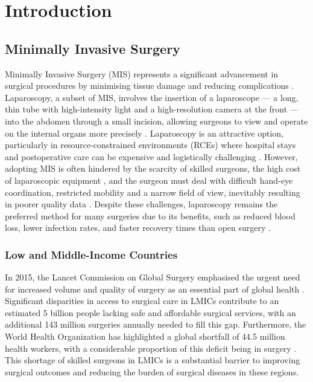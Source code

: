 \section{Introduction}

\subsection{Minimally Invasive Surgery}

Minimally Invasive Surgery (MIS) represents a significant advancement in surgical procedures by minimising tissue damage and reducing complications \cite{jaffray_minimally_2005}. Laparoscopy, a subset of MIS, involves the insertion of a laparoscope — a long, thin tube with high-intensity light and a high-resolution camera at the front — into the abdomen through a small incision, allowing surgeons to view and operate on the internal organs more precisely \cite{monnet_laparoscopy_2003}. Laparoscopy is an attractive option, particularly in resource-constrained environments (RCEs) where hospital stays and postoperative care can be expensive and logistically challenging \cite{rockall_laparoscopy_2014}. However, adopting MIS is often hindered by the scarcity of skilled surgeons, the high cost of laparoscopic equipment \cite{meara_global_2015}, and the surgeon must deal with difficult hand-eye coordination, restricted mobility and a narrow field of view, inevitably resulting in poorer quality data \cite{bodenstedt_comparative_2018}. Despite these challenges, laparoscopy remains the preferred method for many surgeries due to its benefits, such as reduced blood loss, lower infection rates, and faster recovery times than open surgery \cite{jaffray_minimally_2005}.

\subsubsection{Low and Middle-Income Countries}

In 2015, the Lancet Commission on Global Surgery emphasised the urgent need for increased volume and quality of surgery as an essential part of global health \cite{meara_global_2015}. Significant disparities in access to surgical care in LMICs contribute to an estimated 5 billion people lacking safe and affordable surgical services, with an additional 143 million surgeries annually needed to fill this gap. Furthermore, the World Health Organization has highlighted a global shortfall of 44.5 million health workers, with a considerable proportion of this deficit being in surgery \cite{world_health_organization_world_2016}. This shortage of skilled surgeons in LMICs is a substantial barrier to improving surgical outcomes and reducing the burden of surgical diseases in these regions. 

